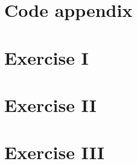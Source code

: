 \documentclass[a4paper,norsk]{article}
\begin{document}
\newpage 
\section*{Code appendix}
\section*{Exercise I}
  
\newpage
\section*{Exercise II}
  
\newpage
\section*{Exercise III}
  
\end{document}
